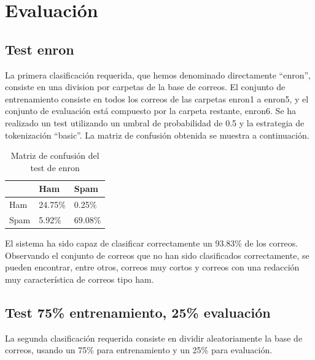 \section{Evaluación}

\subsection{Test enron}

La primera clasificación requerida, que hemos denominado directamente ``enron'',
consiste en una division por carpetas de la base de correos. El conjunto de
entrenamiento consiste en todos los correos de las carpetas enron1 a enron5, y
el conjunto de evaluación está compuesto por la carpeta restante, enron6.  Se ha
realizado un test utilizando un umbral de probabilidad de 0.5 y la estrategia de
tokenización ``basic''. La matriz de confusión obtenida se muestra a
continuación.

\begin{table}[ht]
	\centering
	\begin{tabular}{l|l|l|}
	\cline{2-3}
				   & Ham     & Spam    \\ \hline
	\multicolumn{1}{|l|}{Ham}  & 24.75\% & 0.25\%  \\ \hline
	\multicolumn{1}{|l|}{Spam} & 5.92\%  & 69.08\% \\ \hline
	\end{tabular}
	\caption{Matriz de confusión del test de enron}
	\label{tab:test-enron}
\end{table}

El sistema ha sido capaz de clasificar correctamente un 93.83\% de los correos.
Observando el conjunto de correos que no han sido clasificados correctamente, se
pueden encontrar, entre otros, correos muy cortos y correos con una redacción
muy característica de correos tipo ham.

\clearpage
\subsection{Test 75\% entrenamiento, 25\% evaluación}

La segunda clasificación requerida consiste en dividir aleatoriamente la base de
correos, usando un 75\% para entrenamiento y un 25\% para evaluación.

